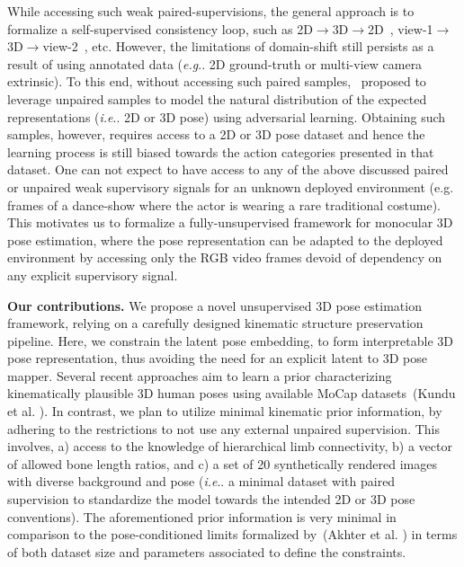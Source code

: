 \documentclass[letterpaper]{article} \usepackage{aaai20}  \usepackage{times}  \usepackage{helvet}  \usepackage{courier}  \usepackage{url}  \usepackage{graphicx}  \usepackage{amsmath}
\makeatletter
\DeclareRobustCommand\onedot{\futurelet\@let@token\@onedot}
\def\@onedot{\ifx\@let@token.\else.\null\fi\xspace}
\def\eg{\emph{e.g}\onedot} \def\Eg{\emph{E.g}\onedot}
\def\ie{\emph{i.e}\onedot} \def\Ie{\emph{I.e}\onedot}
\makeatother
\begin{document}
While accessing such weak paired-supervisions, the general approach is to formalize a self-supervised consistency loop, such as 2D$\rightarrow$3D$\rightarrow$2D~\cite{tung2017adversarial}, view-1$\rightarrow$3D$\rightarrow$view-2~\cite{kocabas2019self}, etc. However, the limitations of domain-shift still persists as a result of using annotated data (\eg 2D ground-truth or multi-view camera extrinsic). To this end, without accessing such paired samples,~\cite{jakab2019learning} proposed to leverage unpaired samples to model the natural distribution of the expected representations (\ie 2D or 3D pose) using adversarial learning. Obtaining such samples, however, requires access to a 2D or 3D pose dataset and hence the learning process is still biased towards the action categories presented in that dataset. One can not expect to have access to any of the above discussed paired or unpaired weak supervisory signals for an unknown deployed environment (e.g. frames of a dance-show where the actor is wearing a rare traditional costume). This motivates us to formalize a fully-unsupervised framework for monocular 3D pose estimation, where the pose representation can be adapted to the deployed environment by accessing only the RGB video frames devoid of dependency on any explicit supervisory signal.

\textbf{Our contributions.} We propose a novel unsupervised 3D pose estimation framework, relying on a carefully designed kinematic structure preservation pipeline. Here, we constrain the latent pose embedding, to form interpretable 3D pose representation, thus avoiding the need for an explicit latent to 3D pose mapper. 
Several recent approaches aim to learn a prior characterizing kinematically plausible 3D human poses using available MoCap datasets~({\color{coolblack}Kundu et al. }\citeyear{kundu2019bihmp}). In contrast, we plan to utilize minimal kinematic prior information, by adhering to the restrictions to not use any external unpaired supervision. This involves, a) access to the knowledge of hierarchical limb connectivity, b) a vector of allowed bone length ratios, and c) a set of 20 synthetically rendered images with diverse background and pose (\ie a minimal dataset with paired supervision to standardize the model towards the intended 2D or 3D pose conventions). The aforementioned prior information is very minimal in comparison to the pose-conditioned limits formalized by~({\color{coolblack}Akhter et al. }\citeyear{akhter2015pose}) in terms of both dataset size and parameters associated to define the constraints.
\end{document}
